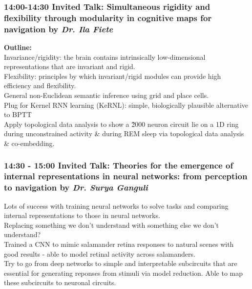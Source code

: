 \documentclass[12pt]{article}
\begin{document}
\subsubsection{14:00-14:30 Invited Talk: Simultaneous rigidity and flexibility through modularity in cognitive maps for navigation by \textit{Dr. Ila Fiete}}

\textbf{Outline:} \\
Invariance/rigidity: the brain contains intrinsically low-dimensional representations that are invariant and rigid. \\

Flexibility: principles by which invariant/rigid modules can provide high efficiency and flexibility. \\

General non-Euclidean semantic inference using grid and place cells. \\

Plug for Kernel RNN learning (KeRNL): simple, biologically plausible alternative to BPTT \cite{roth2018kernel} \\

Apply topological data analysis to show a \~2000 neuron circuit \cite{Chaudhuri2019} lie on a 1D ring during unconstrained activity \& during REM sleep via topological data analysis \& co-embedding. \\


\subsubsection{14:30 - 15:00 Invited Talk: Theories for the emergence of internal representations in neural networks: from perception to navigation by \textit{Dr. Surya Ganguli}}

Lots of success with training neural networks to solve tasks and comparing internal representations to those in neural networks. \\

Replacing something we don't understand with something else we don't understand? \\

Trained a CNN to mimic salamander retina responses to natural scenes with good results - able to model retinal activity across salamanders. \\

Try to go from deep networks to simple and interpretable subcircuits that are essential for generating reponses from stimuli via model reduction. Able to map these subcircuits to neuronal circuits. \\
\end{document}
